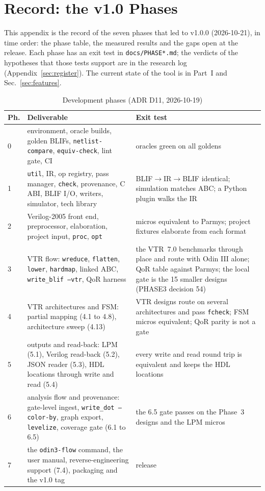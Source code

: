 \documentclass[conference]{IEEEtran}
\newcommand{\code}[1]{\texttt{#1}}
\begin{document}
\section{Record: the v1.0 Phases}
\label{sec:status}

This appendix is the record of the seven phases that led to v1.0.0 (2026-10-21), in time order: the
phase table, the measured results and the gaps open at the release. Each phase has an exit test in
\code{docs/PHASE*.md}; the verdicts of the hypotheses that those tests support are in the research
log (Appendix~\ref{sec:register}). The current state of the tool is in Part~I and Sec.~\ref{sec:features}.

\begin{table}[!tp]
\caption{Development phases (ADR D11, 2026-10-19)}
\label{tab:phases}
\centering
\footnotesize
\begin{tabular}{@{}p{}>{\raggedright\arraybackslash}p{}%
  >{\raggedright\arraybackslash}p{}@{}}
\toprule
Ph. & Deliverable & Exit test \\
\midrule
0 & environment, oracle builds, golden BLIFs, \code{netlist-compare}, \code{equiv-check}, lint
  gate, CI & oracles green on all goldens \\
1 & \code{util}, IR, op registry, pass manager, \code{check}, provenance, C ABI, BLIF I/O,
  writers, simulator, tech library & BLIF$\to$IR$\to$BLIF identical; simulation matches ABC; a
  Python plugin walks the IR \\
2 & Verilog-2005 front end, preprocessor, elaboration, project input, \code{proc}, \code{opt} &
  micros equivalent to Parmys; project fixtures elaborate from each format \\
3 & VTR flow: \code{wreduce}, \code{flatten}, \code{lower}, \code{hardmap}, linked ABC,
  \code{write\_blif --vtr}, QoR harness & the VTR~7.0 benchmarks through place and route with
  Odin III alone; QoR table against Parmys; the local gate is the 15 smaller designs (PHASE3
  decision 54) \\
4 & VTR architectures and FSM: partial mapping (4.1 to 4.8), architecture sweep (4.13) & VTR
  designs route on several architectures and pass \code{fcheck}; FSM micros equivalent; QoR
  parity is not a gate \\
5 & outputs and read-back: LPM (5.1), Verilog read-back (5.2), JSON reader (5.3), HDL locations
  through write and read (5.4) & every write and read round trip is equivalent and keeps the HDL
  locations \\
6 & analysis flow and provenance: gate-level ingest, \code{write\_dot --color-by}, graph export,
  \code{levelize}, coverage gate (6.1 to 6.5) & the 6.5 gate passes on the Phase~3 designs and
  the LPM micros \\
7 & the \code{odin3-flow} command, the user manual, reverse-engineering support (7.4), packaging
  and the v1.0 tag & release \\
\bottomrule
\end{tabular}
\end{table}
\end{document}
